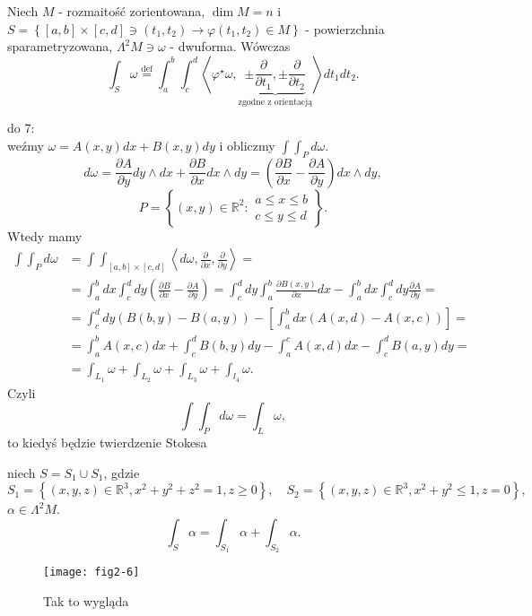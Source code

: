 \documentclass[../main.tex]{subfiles}
\begin{document}
\pagebreak
\begin{definicja}
    Niech $M$ - rozmaitość zorientowana, $\dim M = n$ i $S = \left\{ [a,b]\times[c,d]\ni (t_1,t_2) \to \varphi(t_1,t_2)\in M \right\}$ - powierzchnia sparametryzowana, $\Lambda^2M\ni\omega$ - dwuforma. Wówczas
    \[
        \int_S \omega \overset{\text{def}}{=} \int_a^b\int_c^d \left<\varphi^\star\omega, \underbrace{\pm \frac{\partial }{\partial t_1} , \pm \frac{\partial }{\partial t_2}}_\text{zgodne z orientacją}\right>dt_1dt_2
    .\]
\end{definicja}
\begin{przyklad}
    do 7:\\
    weźmy $\omega = A(x,y)dx + B(x,y)dy$ i obliczmy $\int\int_P d\omega$.
     \[
         d\omega = \frac{\partial A}{\partial y} dy\land dx + \frac{\partial B}{\partial x} dx\land dy = \left(\frac{\partial B}{\partial x} - \frac{\partial A}{\partial y} \right)dx\land dy
    ,\]
\[
    P = \left\{ (x,y)\in \mathbb{R}^2: \begin{matrix}a\le x\le b\\ c\le y \le d \end{matrix} \right\}
.\]
Wtedy mamy
\begin{align*}
    \int\int_P d\omega &= \int\int_{[a,b]\times[c,d]} \left<d\omega, \frac{\partial }{\partial x} , \frac{\partial }{\partial y}  \right> = \\
    &= \int_a^b dx \int_c^d dy\left(\frac{\partial B}{\partial x} - \frac{\partial A}{\partial y} \right) = \int_c^d dy\int_a^b \frac{\partial B(x,y)}{\partial x} dx - \int_a^bdx\int_c^ddy \frac{\partial A}{\partial y} = \\
    &= \int_c^d dy(B(b,y) - B(a,y)) - \left[ \int_a^bdx \left( A(x,d) - A(x,c) \right)  \right] = \\
    &= \int_a^bA(x,c)dx + \int_c^dB(b,y)dy - \int_a^cA(x,d)dx - \int_c^dB(a,y)dy =\\
    &= \int_{L_1}\omega + \int_{L_2}\omega + \int_{L_3}\omega + \int_{l_4}\omega
.\end{align*}
Czyli \[
\int\int_Pd\omega = \int_L \omega
,\]
to kiedyś będzie twierdzenie Stokesa
\end{przyklad}
\begin{przyklad}
    niech $S = S_1\cup S_1$, gdzie
    \[
        S_1 = \left\{ (x,y,z)\in \mathbb{R}^3, x^2 + y^2 + z^2 = 1, z\ge 0 \right\},\quad S_2 = \left\{ (x,y,z)\in \mathbb{R}^3, x^2+y^2 \le 1, z = 0 \right\}
    ,\]
$\alpha\in \Lambda^2M$.
\[
\int_S \alpha = \int_{S_1}\alpha + \int_{S_2}\alpha
.\]
    \begin{figure}[h]
        \centering
        \texttt{[image: fig2-6]}
        \caption{Tak to wygląda}
        \label{fig:fig2-6}
    \end{figure}
\end{przyklad}
\end{document}
